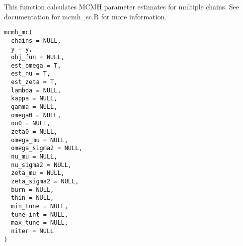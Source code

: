 \documentclass[a4paper]{book}
\begin{document}
%
\begin{Description}\relax
This function calculates MCMH parameter estimates for multiple chains. See
documentation for mcmh\_sc.R for more information.
\end{Description}
%
\begin{Usage}
\begin{verbatim}
mcmh_mc(
  chains = NULL,
  y = y,
  obj_fun = NULL,
  est_omega = T,
  est_nu = T,
  est_zeta = T,
  lambda = NULL,
  kappa = NULL,
  gamma = NULL,
  omega0 = NULL,
  nu0 = NULL,
  zeta0 = NULL,
  omega_mu = NULL,
  omega_sigma2 = NULL,
  nu_mu = NULL,
  nu_sigma2 = NULL,
  zeta_mu = NULL,
  zeta_sigma2 = NULL,
  burn = NULL,
  thin = NULL,
  min_tune = NULL,
  tune_int = NULL,
  max_tune = NULL,
  niter = NULL
)
\end{verbatim}
\end{Usage}
%
\end{document}
